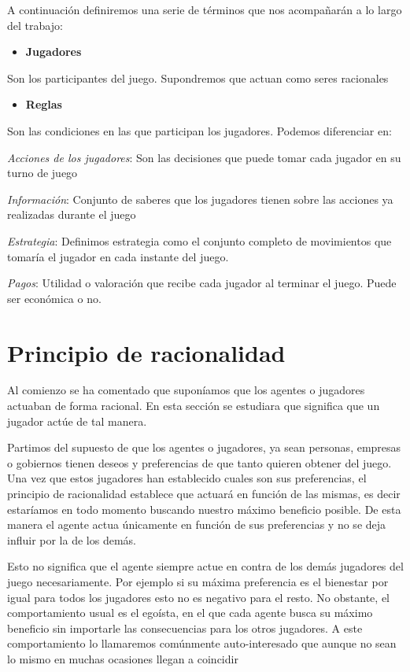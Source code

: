\documentclass[12pt,a4paper,]{book}
\providecommand{\tightlist}{%
  \setlength{\itemsep}{0pt}\setlength{\parskip}{0pt}}
\numberwithin{dummy}{section}
\theoremstyle{ocrenumbox}
\theoremstyle{blacknumex}
\theoremstyle{blacknumbox}
\theoremstyle{ocrenum}
\theoremstyle{ocrenum}
\begin{document}
A continuación definiremos una serie de términos que nos acompañarán a
lo largo del trabajo:

\begin{itemize}
\tightlist
\item
  \textbf{Jugadores}
\end{itemize}

Son los participantes del juego. Supondremos que actuan como seres
racionales

\begin{itemize}
\tightlist
\item
  \textbf{Reglas}
\end{itemize}

Son las condiciones en las que participan los jugadores. Podemos
diferenciar en:

\emph{Acciones de los jugadores}: Son las decisiones que puede tomar
cada jugador en su turno de juego

\emph{Información}: Conjunto de saberes que los jugadores tienen sobre
las acciones ya realizadas durante el juego

\emph{Estrategia}: Definimos estrategia como el conjunto completo de
movimientos que tomaría el jugador en cada instante del juego.

\emph{Pagos}: Utilidad o valoración que recibe cada jugador al terminar
el juego. Puede ser económica o no.

\hypertarget{Seccion12}{%
\section{Principio de racionalidad}\label{Seccion12}}

Al comienzo se ha comentado que suponíamos que los agentes o jugadores
actuaban de forma racional. En esta sección se estudiara que significa
que un jugador actúe de tal manera.

Partimos del supuesto de que los agentes o jugadores, ya sean personas,
empresas o gobiernos tienen deseos y preferencias de que tanto quieren
obtener del juego. Una vez que estos jugadores han establecido cuales
son sus preferencias, el principio de racionalidad establece que actuará
en función de las mismas, es decir estaríamos en todo momento buscando
nuestro máximo beneficio posible. De esta manera el agente actua
únicamente en función de sus preferencias y no se deja influir por la de
los demás.

Esto no significa que el agente siempre actue en contra de los demás
jugadores del juego necesariamente. Por ejemplo si su máxima preferencia
es el bienestar por igual para todos los jugadores esto no es negativo
para el resto. No obstante, el comportamiento usual es el egoísta, en el
que cada agente busca su máximo beneficio sin importarle las
consecuencias para los otros jugadores. A este comportamiento lo
llamaremos comúnmente auto-interesado que aunque no sean lo mismo en
muchas ocasiones llegan a coincidir
\end{document}
